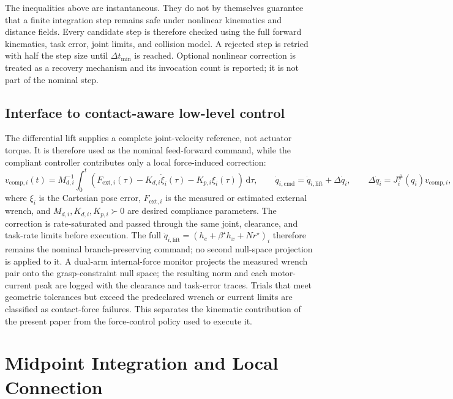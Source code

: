 \documentclass[preprint,12pt]{elsarticle}
\begin{document}
The inequalities above are instantaneous. They do not by themselves guarantee that a finite integration step remains safe under nonlinear kinematics and distance fields. Every candidate step is therefore checked using the full forward kinematics, task error, joint limits, and collision model. A rejected step is retried with half the step size until $\Delta t_{\min}$ is reached. Optional nonlinear correction is treated as a recovery mechanism and its invocation count is reported; it is not part of the nominal step.

\subsection{Interface to contact-aware low-level control}

The differential lift supplies a complete joint-velocity reference, not actuator torque. It is therefore used as the nominal feed-forward command, while the compliant controller contributes only a local force-induced correction:
\begin{equation}
v_{\mathrm{comp},i}(t)=M_{d,i}^{-1}\int_{0}^{t}
\left(F_{\mathrm{ext},i}(\tau)-K_{d,i}\dot\xi_i(\tau)-K_{p,i}\xi_i(\tau)\right)\,\mathrm d\tau,
\qquad
\dot q_{i,\mathrm{cmd}}=\dot q_{i,\mathrm{lift}}+\Delta\dot q_i,
\qquad
\Delta\dot q_i=J_i^{\#}(q_i)v_{\mathrm{comp},i},
\label{eq:impedance_interface}
\end{equation}
where $\xi_i$ is the Cartesian pose error, $F_{\mathrm{ext},i}$ is the measured or estimated external wrench, and $M_{d,i},K_{d,i},K_{p,i}\succ0$ are desired compliance parameters. The correction is rate-saturated and passed through the same joint, clearance, and task-rate limits before execution. The full $\dot q_{i,\mathrm{lift}}=(h_e+\beta^\star h_x+N r^\star)_i$ therefore remains the nominal branch-preserving command; no second null-space projection is applied to it. A dual-arm internal-force monitor projects the measured wrench pair onto the grasp-constraint null space; the resulting norm and each motor-current peak are logged with the clearance and task-error traces. Trials that meet geometric tolerances but exceed the predeclared wrench or current limits are classified as contact-force failures. This separates the kinematic contribution of the present paper from the force-control policy used to execute it.

\section{Midpoint Integration and Local Connection}
\label{sec:integration}
\end{document}
